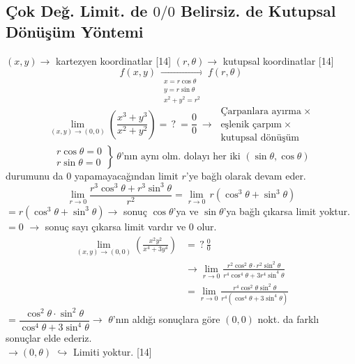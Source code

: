 \documentclass[11pt,a4paper]{article}
\begin{document}
\subsection{Çok Değ. Limit. de $0/0$ Belirsiz. de Kutupsal Dönüşüm Yöntemi}
$(x,y)\to$ kartezyen koordinatlar
[14]
$(r,\theta)\to$ kutupsal koordinatlar
[14]
\[ f(x,y)\ \xrightarrow[\substack{x=r\cos\theta\\ y=r\sin\theta\\ x^2+y^2=r^2}]{}\ f(r,\theta) \]
\[ \lim_{(x,y)\to(0,0)}\left(\frac{x^3+y^3}{x^2+y^2}\right)=\,?\ =\frac00\ \to\ \begin{array}{l}\text{Çarpanlara ayırma}\ \times\\ \text{eşlenik çarpım}\ \times\\ \text{kutupsal dönüşüm}\end{array} \]
\[ \left.\begin{array}{l}r\cos\theta=0\\ r\sin\theta=0\end{array}\right\}\ \theta\text{'nın aynı olm. dolayı her iki }(\sin\theta,\cos\theta) \]
durumunu da 0 yapamayacağından limit $r$'ye bağlı olarak devam eder.
\[ \lim_{r\to0}\frac{r^3\cos^3\theta+r^3\sin^3\theta}{r^2}=\lim_{r\to0}\,r(\cos^3\theta+\sin^3\theta) \]
$=r(\cos^3\theta+\sin^3\theta)\to$ sonuç $\cos\theta$'ya ve $\sin\theta$'ya bağlı çıkarsa limit yoktur.\\
$=0$ \quad $\to$ sonuç sayı çıkarsa limit vardır ve 0 olur.
\begin{align*}
\lim_{(x,y)\to(0,0)}\left(\frac{x^2y^2}{x^4+3y^4}\right)&=\,?\ \frac00\\
&\to\lim_{r\to0}\frac{r^2\cos^2\theta\cdot r^2\sin^2\theta}{r^4\cos^4\theta+3r^4\sin^4\theta}\\
&=\lim_{r\to0}\frac{r^4\cos^2\theta\sin^2\theta}{r^4(\cos^4\theta+3\sin^4\theta)}
\end{align*}
$=\dfrac{\cos^2\theta\cdot\sin^2\theta}{\cos^4\theta+3\sin^4\theta}\to$ $\theta$'nın aldığı sonuçlara göre $(0,0)$ nokt. da farklı sonuçlar elde ederiz.\\
$\to(0,\theta)$ \quad $\hookrightarrow$ Limiti yoktur.
[14]

\end{document}
